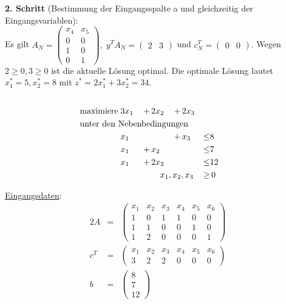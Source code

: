 \documentclass[10pt,a4paper,oneside,ngerman,numbers=noenddot]{scrartcl}
\begin{document}
		\textbf{2. Schritt} (Bestimmung der Eingangsspalte a und gleichzeitig der Eingangsvariablen):\\
		Es gilt $A_{N} = \begin{pmatrix} x_{4} & x_{5} \\ 0 & 0 \\ 1 & 0 \\ 0 & 1 \end{pmatrix},\; y^{T}A_{N} = \begin{pmatrix} 2 & 3 \end{pmatrix}$ und $c_{N}^{T} = \begin{pmatrix} 0 & 0 \end{pmatrix}$. Wegen $2 \geq 0, 3 \geq 0$ ist die aktuelle Lösung optimal. Die optimale Lösung lautet $x_{1}^{*} = 5, x_{2}^{*} = 8$ mit $z^{*} = 2x_{1}^{*} + 3x_{2}^{*} = 34$.
	\subsection{} %
		\begin{alignat*}{4}
			\text{maximiere}\; & 3x_{1} \,&+&\, 2x_{2} \,&+&\, 2x_{3} && \\
			\multicolumn{8}{l}{\text{unter den Nebenbedingungen}} && \\
			\;& x_{1} \,&&\, \,&+&\, x_{3} \,&\leq & 8 \\
			\;& x_{1} \,&+&\, x_{2} \,&&\, \,&\leq & 7 \\
			\;& x_{1} \,&+&\, 2x_{2} \,&&\, \,&\leq & 12 \\			
			\multicolumn{6}{r}{$x_{1}, x_{2}, x_{3}$} \,&\geq &\, 0
		\end{alignat*}
		
		\underline{Eingangsdaten}:
		\begin{alignat*}{2}
			A &=& \begin{pmatrix}
				x_{1} & x_{2} & x_{3} & x_{4} & x_{5} & x_{6} \\
				1 & 0 & 1 & 1 & 0 & 0 \\
				1 & 1 & 0 & 0 & 1 & 0\\
				1 & 2 & 0 & 0 & 0 & 1
			\end{pmatrix} \\
			c^{T} &=& \begin{pmatrix}
				x_{1} & x_{2} & x_{3} & x_{4} & x_{5} & x_{6} \\
				3 & 2 & 2 & 0 & 0 & 0
			\end{pmatrix} \\
			b &=& \begin{pmatrix}
				8 \\
				7 \\
				12
			\end{pmatrix}
		\end{alignat*}
\end{document}
